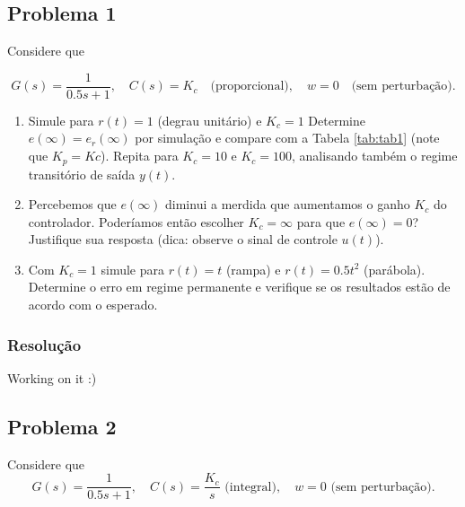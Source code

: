 \documentclass[
]{book}
\providecommand{\tightlist}{%
  \setlength{\itemsep}{0pt}\setlength{\parskip}{0pt}}
\begin{document}
\hypertarget{problema-1-2}{%
\subsection*{Problema 1}\label{problema-1-2}}

Considere que

\[
G(s) = \frac {1}{0.5s+1}, \quad C(s) = K_c \quad \text{(proporcional)}, \quad w=0 \quad \text{(sem perturbação)}.
\]

\begin{enumerate}
\def\labelenumi{\alph{enumi}.}
\tightlist
\item
  Simule para \(r(t) = 1\) (degrau unitário) e \(K_c = 1\) Determine \(e(\infty) = e_r(\infty)\) por simulação e compare com a Tabela \ref{tab:tab1} (note que \(K_p = Kc\)). Repita para \(K_c = 10\) e \(K_c = 100\), analisando também o regime transitório de saída \(y(t)\).
\item
  Percebemos que \(e(\infty)\) diminui a merdida que aumentamos o ganho \(K_c\) do controlador. Poderíamos então escolher \(K_c = \infty\) para que \(e(\infty) = 0\)? Justifique sua resposta (dica: observe o sinal de controle \(u(t)\)).
\item
  Com \(K_c = 1\) simule para \(r(t) = t\) (rampa) e \(r(t) = 0.5t^2\) (parábola). Determine o erro em regime permanente e verifique se os resultados estão de acordo com o esperado.
\end{enumerate}

\hypertarget{resoluuxe7uxe3o-10}{%
\subsubsection*{Resolução}\label{resoluuxe7uxe3o-10}}

Working on it :)

\hypertarget{problema-2-2}{%
\subsection*{Problema 2}\label{problema-2-2}}

Considere que
\[
G(s) = \frac {1}{0.5s+1}, \quad C(s) = \frac{K_c}{s} \text{ (integral)}, \quad w=0 \text{ (sem perturbação).}
\]
\end{document}
